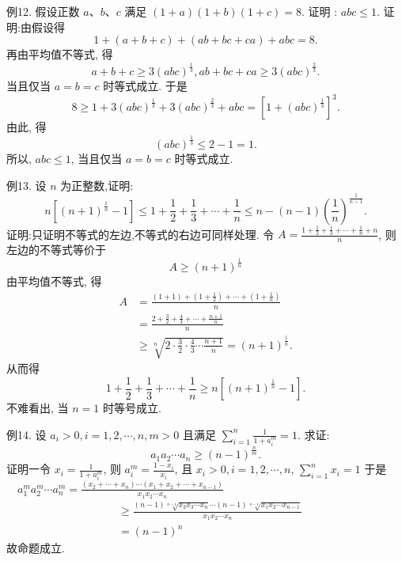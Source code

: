 例12. 假设正数 $a 、 b 、 c$ 满足 $(1+a)(1+b)(1+c)=8$. 证明 : $a b c \leqslant 1$.
证明:由假设得
$$
1+(a+b+c)+(a b+b c+c a)+a b c=8 .
$$
再由平均值不等式, 得
$$
a+b+c \geqslant 3(a b c)^{\frac{1}{3}}, a b+b c+c a \geqslant 3(a b c)^{\frac{2}{3}} .
$$
当且仅当 $a=b=c$ 时等式成立.
于是
$$
8 \geqslant 1+3(a b c)^{\frac{1}{3}}+3(a b c)^{\frac{2}{3}}+a b c=\left[1+(a b c)^{\frac{1}{3}}\right]^3 .
$$
由此, 得
$$
(a b c)^{\frac{1}{3}} \leqslant 2-1=1 .
$$
所以, $a b c \leqslant 1$, 当且仅当 $a=b=c$ 时等式成立.



例13. 设 $n$ 为正整数,证明:
$$
n\left[(n+1)^{\frac{1}{n}}-1\right] \leqslant 1+\frac{1}{2}+\frac{1}{3}+\cdots+\frac{1}{n} \leqslant n-(n-1)\left(\frac{1}{n}\right)^{\frac{1}{n-1}} .
$$
证明:只证明不等式的左边,不等式的右边可同样处理.
令 $A=\frac{1+\frac{1}{2}+\frac{1}{3}+\cdots+\frac{1}{n}+n}{n}$, 则左边的不等式等价于
$$
A \geqslant(n+1)^{\frac{1}{n}}
$$
由平均值不等式, 得
$$
\begin{aligned}
A & =\frac{(1+1)+\left(1+\frac{1}{2}\right)+\cdots+\left(1+\frac{1}{n}\right)}{n} \\
& =\frac{2+\frac{3}{2}+\frac{4}{3}+\cdots+\frac{n+1}{n}}{n} \\
& \geqslant \sqrt[n]{2 \cdot \frac{3}{2} \cdot \frac{4}{3} \cdots \frac{n+1}{n}}=(n+1)^{\frac{1}{n}} .
\end{aligned}
$$
从而得
$$
1+\frac{1}{2}+\frac{1}{3}+\cdots+\frac{1}{n} \geqslant n\left[(n+1)^{\frac{1}{n}}-1\right] .
$$
不难看出, 当 $n=1$ 时等号成立.



例14. 设 $a_i>0, i=1,2, \cdots, n, m>0$ 且满足 $\sum_{i=1}^n \frac{1}{1+a_i^m}=1$. 求证:
$$
a_1 a_2 \cdots a_n \geqslant(n-1)^{\frac{n}{m}} .
$$
证明一令 $x_i=\frac{1}{1+a_i^m}$, 则 $a_i^m=\frac{1-x_i}{x_i}$, 且 $x_i>0, i=1,2, \cdots, n$, $\sum_{i=1}^n x_i=1$
于是 $\quad a_1^m a_2^m \cdots a_n^m=\frac{\left(x_2+\cdots+x_n\right) \cdots\left(x_1+x_2+\cdots+x_{n-1}\right)}{x_1 x_2 \cdots x_n}$
$$
\begin{aligned}
& \geqslant \frac{(n-1) \sqrt[n-1]{x_2 x_3 \cdots x_n} \cdots(n-1) \sqrt[n-1]{x_1 x_2 \cdots x_{n-1}}}{x_1 x_2 \cdots x_n} \\
& =(n-1)^n
\end{aligned}
$$
故命题成立.



